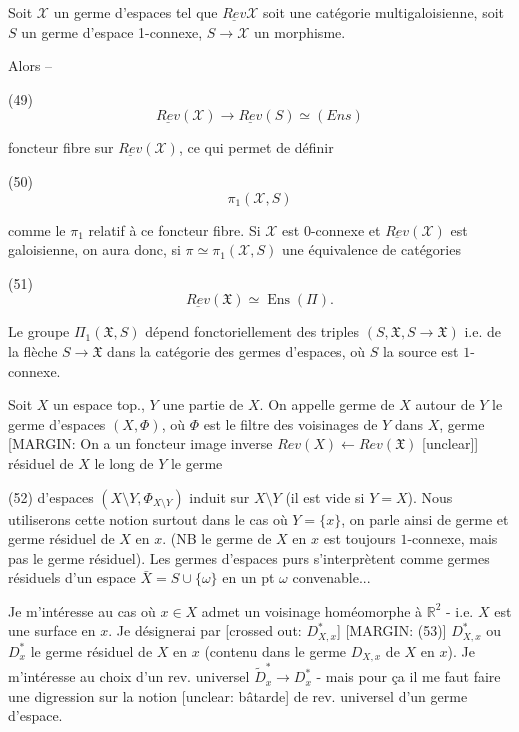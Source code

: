 Soit $\mathcal{X}$ un germe d'espaces tel que $\underline{Rev} \mathcal{X}$ soit une catégorie multigaloisienne, soit $S$ un germe d'espace 1-connexe, $S \to \mathcal{X}$ un morphisme.

Alors -- 

(49) $$ \underline{Rev}(\mathcal{X}) \to \underline{Rev}(S) \simeq (Ens) $$

foncteur fibre sur $\underline{Rev}(\mathcal{X})$, ce qui permet de définir

(50) $$ \pi_1(\mathcal{X}, S) $$

comme le $\pi_1$ relatif à ce foncteur fibre. Si $\mathcal{X}$ est 0-connexe et $\underline{Rev}(\mathcal{X})$ est galoisienne, on aura donc, si $\pi \simeq \pi_1(\mathcal{X}, S)$ une équivalence de catégories

\newpage


(51) 
$$ \underline{Rev}(\mathfrak{X}) \simeq \operatorname{Ens}(\Pi) . $$

Le groupe $\Pi_1(\mathfrak{X}, S)$ dépend fonctoriellement
des triples $(S, \mathfrak{X}, S \to \mathfrak{X})$ i.e. de
la flèche $S \to \mathfrak{X}$ dans la catégorie des
germes d'espaces, où $S$ la source est
$1$-connexe.

Soit $X$ un espace top., $Y$ une partie de
$X$. On appelle germe de $X$ autour de $Y$
le germe d'espaces $(X, \Phi)$, où $\Phi$ est le
filtre des voisinages de $Y$ dans $X$, germe
[MARGIN: On a un foncteur image inverse $Rev(X) \leftarrow Rev(\mathfrak{X})$ [unclear]]
résiduel de $X$ le long de $Y$ le germe

(52)
d'espaces $(X \setminus Y, \Phi_{X \setminus Y})$ induit sur $X \setminus Y$
(il est vide si $Y = X$). Nous
utiliserons cette notion surtout dans le cas
où $Y = \{x\}$, on parle ainsi de germe
et germe résiduel de $X$ en $x$. (NB le
germe de $X$ en $x$ est toujours $1$-connexe,
mais pas le germe résiduel). Les
germes d'espaces purs s'interprètent comme
germes résiduels d'un espace
$\bar{X} = S \cup \{\omega\}$ en un pt $\omega$ convenable...

\newpage


Je m'intéresse au cas où $x \in X$ admet un
voisinage homéomorphe à $\mathbb{R}^2$ - i.e. $X$ est une
surface en $x$. Je désignerai par [crossed out: $D_{X,x}^*$]
[MARGIN: (53)] $D_{X,x}^*$ ou $D_x^*$
le germe résiduel de $X$ en $x$ (contenu
dans le germe $D_{X,x}$ de $X$ en $x$).
Je m'intéresse au choix d'un rev. universel
$\tilde{D}_x^* \to D_x^*$ - mais pour ça il me
faut faire une digression sur la notion
[unclear: bâtarde] de rev. universel d'un germe
d'espace.

